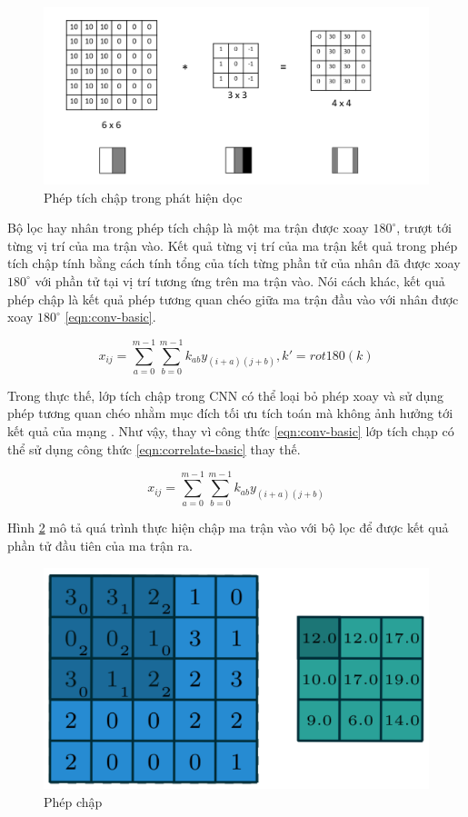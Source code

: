\begin{figure}[h]
	\centering
	\includegraphics[width=0.8\linewidth]{images/edge-detection-conv}
	\caption{Phép tích chập trong phát hiện dọc}
	\label{fig:edge-detection-conv}
\end{figure}

Bộ lọc hay nhân trong phép tích chập là một ma trận được xoay $180^\circ$, trượt tới từng vị trí của ma trận vào. Kết quả từng vị trí của ma trận kết quả trong phép tích chập tính bằng cách tính tổng của tích từng phần tử của nhân đã được xoay $180^\circ$ với phần tử tại vị trí tương ứng trên ma trận vào. Nói cách khác, kết quả phép chập là kết quả phép tương quan chéo giữa ma trận đầu vào với nhân được xoay $180^\circ$ \ref{eqn:conv-basic}.

\begin{equation}\label{eqn:conv-basic}
	x_{ij} = \sum^{m-1}_{a = 0} \sum^{m-1}_{b = 0} k_{ab} y_{(i+a)(j+b)}, k' = rot180(k)
\end{equation}

Trong thực thế, lớp tích chập trong CNN có thể loại bỏ phép xoay và sử dụng phép tương quan chéo nhằm mục đích tối ưu tích toán mà không ảnh hưởng tới kết quả của mạng \cite{8721631}. Như vậy, thay vì công thức \ref{eqn:conv-basic} lớp tích chạp có thể sử dụng công thức \ref{eqn:correlate-basic} thay thế.

\begin{equation}\label{eqn:correlate-basic}
	x_{ij} = \sum^{m-1}_{a = 0} \sum^{m-1}_{b = 0} k_{ab} y_{(i+a)(j+b)}
\end{equation}

Hình \ref{fig:conv-operation} mô tả quá trình thực hiện chập ma trận vào với bộ lọc để được kết quả phần tử đầu tiên của ma trận ra.

\begin{figure}
	\centering
	\includegraphics[width=0.6\linewidth]{images/conv-operation}
	\caption{Phép chập}
	\label{fig:conv-operation}
\end{figure}

